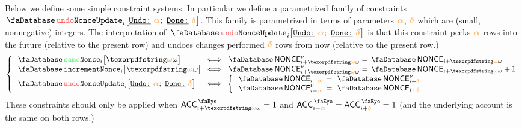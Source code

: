 Below we define some simple constraint systems.
In particular we define a parametrized family of constraints $\accUndoNonceUpdate {i}{\reluo}{\reldo}$.
This family is parametrized in terms of parameters $\reluo$, $\reldo$ which are (small, nonnegative) integers.
The interpretation of $\accUndoNonceUpdate {i}{\reluo}{\reldo}$ is that this constraint peeks $\reluo$ rows into the future (relative to the present row) and undoes changes performed $\reldo$ rows from now (relative to the present row.)
\[
	\left\{ \begin{array}{lcl}
		\accSameNonce          {i}{\relof}         & \!\!\! \iff \!\!\! & \accNonce\new_{i + \relof} = \accNonce_{i + \relof}     \\
		\accIncrementNonce     {i}{\relof}         & \!\!\! \iff \!\!\! & \accNonce\new_{i + \relof} = \accNonce_{i + \relof} + 1 \\
		\accUndoNonceUpdate    {i}{\reluo}{\reldo} & \!\!\! \iff \!\!\! &
		\left\{\begin{array}{lcl}
			\accNonce    _{i + \reluo} & \!\!\! = \!\!\! & \accNonce\new_{i + \reldo} \\
			\accNonce\new_{i + \reluo} & \!\!\! = \!\!\! & \accNonce    _{i + \reldo} \\
		\end{array}\right.\\
	\end{array} \right.
\]
These constraints should only be applied when $\peekAccount_{i + \relof} = 1$ 
and $\peekAccount_{i + \reluo} = \peekAccount_{i + \reldo} = 1$ (and the underlying account is the same on both rows.)
